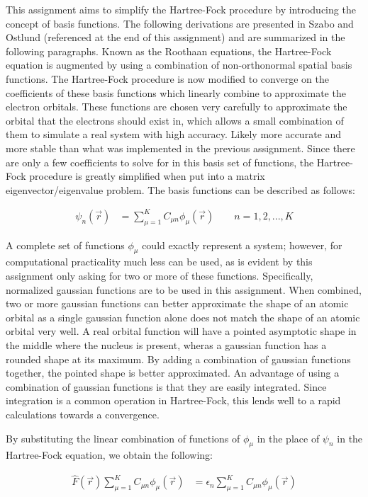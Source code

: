 \documentclass[10pt, oneside, letterpaper]{article}
\begin{document}
This assignment aims to simplify the Hartree-Fock procedure by introducing the concept of basis functions. The following derivations are presented in Szabo and Ostlund (referenced at the end of this assignment) and are summarized in the following paragraphs. Known as the Roothaan equations, the Hartree-Fock equation is augmented by using a combination of non-orthonormal spatial basis functions. The Hartree-Fock procedure is now modified to converge on the coefficients of these basis functions which linearly combine to approximate the electron orbitals. These functions are chosen very carefully to approximate the orbital that the electrons should exist in, which allows a small combination of them to simulate a real system with high accuracy. Likely more accurate and more stable than what was implemented in the previous assignment. Since there are only a few coefficients to solve for in this basis set of functions, the Hartree-Fock procedure is greatly simplified when put into a matrix eigenvector/eigenvalue problem. The basis functions can be described as follows:

\begin{align*}
  \psi_n(\vec{r}) &= \sum_{\mu = 1}^K C_{\mu n}\phi_\mu(\vec{r}) \qquad n = 1, 2, ... , K
\end{align*}

A complete set of functions $\phi_\mu$ could exactly represent a system; however, for computational practicality much less can be used, as is evident by this assignment only asking for two or more of these functions. Specifically, normalized gaussian functions are to be used in this assignment. When combined, two or more gaussian functions can better approximate the shape of an atomic orbital as a single gaussian function alone does not match the shape of an atomic orbital very well. A real orbital function will have a pointed asymptotic shape in the middle where the nucleus is present, wheras a gaussian function has a rounded shape at its maximum. By adding a combination of gaussian functions together, the pointed shape is better approximated. An advantage of using a combination of gaussian functions is that they are easily integrated. Since integration is a common operation in Hartree-Fock, this lends well to a rapid calculations towards a convergence.

By substituting the linear combination of functions of $\phi_\mu$ in the place of $\psi_n$ in the Hartree-Fock equation, we obtain the following:

\begin{align*}
  \hat{F}(\vec{r})\sum_{\mu = 1}^K C_{\mu n}\phi_\mu(\vec{r}) &= \epsilon_n\sum_{\mu = 1}^K C_{\mu n}\phi_\mu(\vec{r})
\end{align*}
\end{document}
